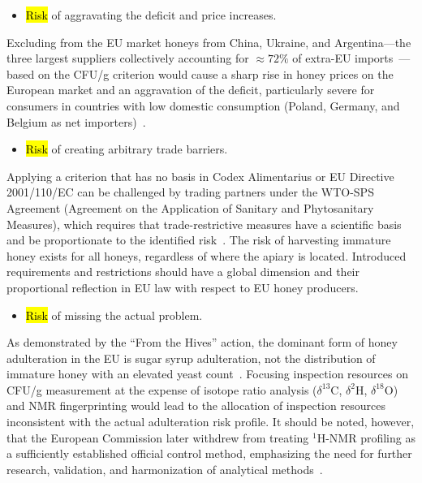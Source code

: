\documentclass[foods,review,accept,pdftex,moreauthors]{Definitions/mdpi}
\begin{document}
{\begin{itemize}
        \item {\hl{Risk} 
 of aggravating the deficit and price increases.}
        \end{itemize}

Excluding from the EU market honeys from China, Ukraine, and
Argentina---the three largest suppliers collectively accounting
for $\approx72\%$ of extra-EU imports~\cite{tridge2024}---based
on the CFU/g criterion would cause a sharp rise in honey prices
on the European market and an aggravation of the deficit,
particularly severe for consumers in countries with low domestic
consumption (Poland, Germany, and Belgium as net
importers)~\cite{eurostat_honey2023}.

\begin{itemize}
        \item {\hl{Risk} 
 of creating arbitrary trade barriers.}
\end{itemize}

Applying a criterion that has no basis in Codex Alimentarius or
EU Directive 2001/110/EC can be challenged by trading partners
under the WTO-SPS Agreement (Agreement on the Application of
Sanitary and Phytosanitary Measures), which requires that
trade-restrictive measures have a scientific basis and be
proportionate to the identified risk~\cite{codex_stan12,eudir2001110}.
The risk of harvesting immature honey exists for all honeys,
regardless of where the apiary is located. Introduced requirements
and restrictions should have a global dimension and their
proportional reflection in EU law with respect to EU honey producers.


\begin{itemize}
        \item {\hl{Risk} 
 of missing the actual problem.}
\end{itemize}

As demonstrated by the ``From the Hives'' action, the dominant
form of honey adulteration in the EU is sugar syrup adulteration,
not the distribution of immature honey with an elevated yeast
count~\cite{eufromhives2021}.
Focusing inspection resources on CFU/g measurement at the expense
of isotope ratio analysis ($\delta^{13}$C, $\delta^{2}$H,
$\delta^{18}$O) and NMR fingerprinting would lead to the allocation
of inspection resources inconsistent with the actual adulteration
risk profile.
It should be noted, however, that the European Commission later
withdrew from treating $^1$H-NMR profiling as a sufficiently
established official control method, emphasizing the need for
further research, validation, and harmonization of analytical
methods~\cite{EuropeanCommission2023NMR}.



}
\end{document}
